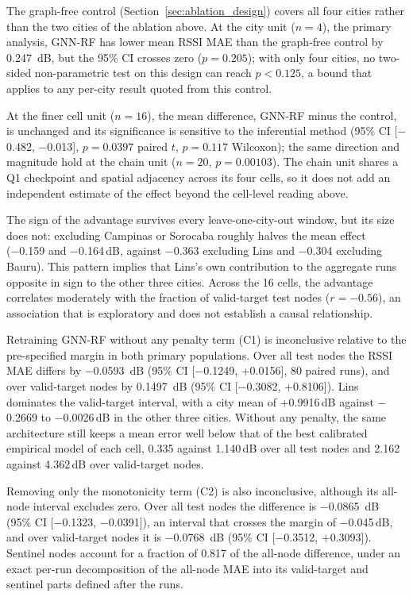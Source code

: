 \documentclass{ieeeaccess}
\begin{document}
The graph-free control (Section~\ref{sec:ablation_design}) covers all four cities rather than the two cities of the ablation above. At the city unit ($n{=}4$), the primary analysis, GNN-RF has lower mean RSSI MAE than the graph-free control by \SI{0.247}{\deci\bel}, but the 95\% CI crosses zero ($p{=}0.205$); with only four cities, no two-sided non-parametric test on this design can reach $p<0.125$, a bound that applies to any per-city result quoted from this control.

At the finer cell unit ($n{=}16$), the mean difference, GNN-RF minus the control, is unchanged and its significance is sensitive to the inferential method (95\% CI [$-$0.482, $-$0.013], $p{=}0.0397$ paired $t$, $p{=}0.117$ Wilcoxon); the same direction and magnitude hold at the chain unit ($n{=}20$, $p{=}0.00103$). The chain unit shares a Q1 checkpoint and spatial adjacency across its four cells, so it does not add an independent estimate of the effect beyond the cell-level reading above.

The sign of the advantage survives every leave-one-city-out window, but its size does not: excluding Campinas or Sorocaba roughly halves the mean effect (\num{-0.159} and \num{-0.164}\,dB, against \num{-0.363} excluding Lins and \num{-0.304} excluding Bauru). This pattern implies that Lins's own contribution to the aggregate runs opposite in sign to the other three cities. Across the 16 cells, the advantage correlates moderately with the fraction of valid-target test nodes ($r{=}-0.56$), an association that is exploratory and does not establish a causal relationship.

Retraining GNN-RF without any penalty term (C1) is inconclusive relative to the pre-specified margin in both primary populations. Over all test nodes the RSSI MAE differs by \SI{-0.0593}{\deci\bel} (95\% CI [$-$0.1249, $+$0.0156], 80 paired runs), and over valid-target nodes by \SI{+0.1497}{\deci\bel} (95\% CI [$-$0.3082, $+$0.8106]). Lins dominates the valid-target interval, with a city mean of $+$0.9916\,dB against $-$0.2669 to $-$0.0026\,dB in the other three cities. Without any penalty, the same architecture still keeps a mean error well below that of the best calibrated empirical model of each cell, 0.335 against 1.140\,dB over all test nodes and 2.162 against 4.362\,dB over valid-target nodes.

Removing only the monotonicity term (C2) is also inconclusive, although its all-node interval excludes zero. Over all test nodes the difference is \SI{-0.0865}{\deci\bel} (95\% CI [$-$0.1323, $-$0.0391]), an interval that crosses the margin of $-$0.045\,dB, and over valid-target nodes it is \SI{-0.0768}{\deci\bel} (95\% CI [$-$0.3512, $+$0.3093]). Sentinel nodes account for a fraction of 0.817 of the all-node difference, under an exact per-run decomposition of the all-node MAE into its valid-target and sentinel parts defined after the runs.
\end{document}
